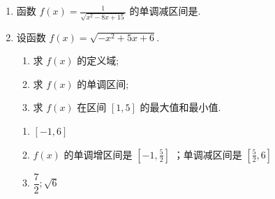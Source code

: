 \begin{enumerate}
\item 函数 $f(x)=\frac{1}{\sqrt{x^2-8 x+15}}$ 的单调减区间是.

\item 设函数 $f(x)=\sqrt{-x^2+5 x+6}$.
\begin{enumerate}
    \item 求 $f(x)$ 的定义域;
    \item 求 $f(x)$ 的单调区间;
    \item 求 $f(x)$ 在区间 $[1,5]$ 的最大值和最小值.
\end{enumerate}
\begin{jieda}
\begin{enumerate}
    \item $[-1,6]$
    \item $f(x)$ 的单调增区间是 $\left[-1, \frac{5}{2}\right]$ ；单调减区间是 $\left[\frac{5}{2}, 6\right]$
    \item $\dfrac{7}{2} ; \sqrt{6}$
\end{enumerate}
\end{jieda}


\end{enumerate}


